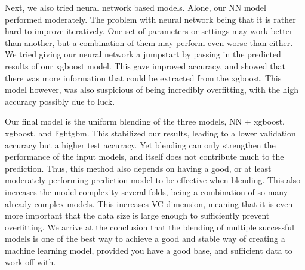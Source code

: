 \documentclass[a4paper, 12pt]{article}
\begin{document}
                Next, we also tried neural network based models. Alone, our NN model performed moderately. The problem with neural network being that it is rather hard to improve iteratively. One set of parameters or settings may work better than another, but a combination of them may perform even worse than either. We tried giving our neural network a jumpstart by passing in the predicted results of our xgboost model. This gave improved accuracy, and showed that there was more information that could be extracted from the xgboost. This model however, was also suspicious of being incredibly overfitting, with the high accuracy possibly due to luck.

                Our final model is the uniform blending of the three models, NN + xgboost, xgboost, and lightgbm. This stabilized our results, leading to a lower validation accuracy but a higher test accuracy. Yet blending can only strengthen the performance of the input models, and itself does not contribute much to the prediction. Thus, this method also depends on having a good, or at least moderately performing prediction model to be effective when blending. This also increases the model complexity several folds, being a combination of so many already complex models. This increases VC dimension, meaning that it is even more important that the data size is large enough to sufficiently prevent overfitting. We arrive at the conclusion that the blending of multiple successful models is one of the best way to achieve a good and stable way of creating a machine learning model, provided you have a good base, and sufficient data to work off with.

\vskip 5cm
{}

\end{document}
